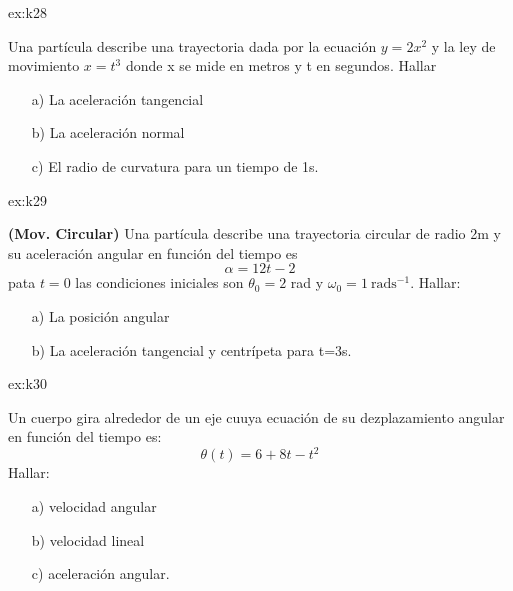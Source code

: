 \begin{multicols}{2}
\begin{excercise}[][][a),$a_t=\frac{738}{\sqrt{153}}$ b) $a_n=\frac{108}{\sqrt{153}}$, c) $\rho=17.5$ m]{ex:k28}
{         Una partícula describe una trayectoria dada por la ecuación $y=2x^2$ y la ley de movimiento $x=t^3$ donde x se mide en metros y t en segundos. Hallar
         \begin{itemize}
             \item[a)] La aceleración tangencial
             \item[b)] La aceleración normal
             \item[c)] El radio de curvatura para un tiempo de 1s.
         \end{itemize}
         }
    \end{excercise}
    \begin{excercise}[][][a) $v=31\ \mathrm{ms^{-1}}$,  $x=19\ \mathrm{m}$; b)  $v=-255\ \mathrm{ms^{-1}}$,  $x=77\ \mathrm{m}$;]{ex:k29}{
            \textbf{(Mov. Circular)} 
            Una partícula describe una trayectoria circular de radio 2m y su aceleración angular en función del tiempo es 
            \begin{equation*}
                \alpha=12t-2
            \end{equation*}
            pata $t=0$ las condiciones iniciales son $\theta_0=2$ rad  y $\omega_0=1 \ \mathrm{rads^{-1}}$. Hallar:
            \begin{itemize}
                \item[a)] La posición angular
                \item[b)] La aceleración tangencial y centrípeta para t=3s.
            \end{itemize}
         }
    \end{excercise}
    \begin{excercise}[][][a) $\omega=2\ \mathrm{rads^{-1}}$, b) $v=0.4\ \mathrm{ms^{-1}}$; c)  $\alpha=-2\ \mathrm{rads^{-2}}$,  d) $a_t=-0.4\ \mathrm{ms^{-2}}$; e) $a_n=0.8\ \mathrm{ms^{-1}}$]{ex:k30}{
         Un cuerpo gira alrededor de un eje cuuya ecuación de su dezplazamiento angular en función del tiempo es:
         \begin{equation*}
             \theta(t)=6+8t-t^2 
         \end{equation*}
         Hallar:
         \begin{itemize}
             \item[a)] velocidad angular
             \item[b)] velocidad lineal 
             \item[c)] aceleración angular.

\end{itemize}}
\end{excercise}
\end{multicols}
